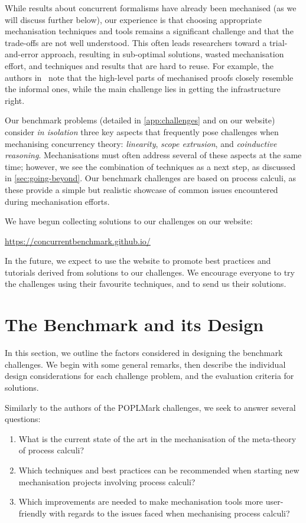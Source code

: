 \documentclass[runningheads]{llncs}
\begin{document}
While results about concurrent
formalisms have already been mechanised (as we will discuss further
below), our experience is that choosing appropriate mechanisation
techniques and tools remains a significant challenge and that the
trade-offs are not well understood.  This often leads researchers
toward a trial-and-error approach, resulting in sub-optimal solutions,
wasted mechanisation effort, and techniques and results that are hard
to reuse. For example, the authors in~\cite{Cruz-Filipe2021b} note that the high-level parts of
mechanised proofs closely resemble the informal ones, while the
main challenge lies in getting the infrastructure right.

Our benchmark problems (detailed in \cref{app:challenges} and on our website) consider
\emph{in isolation} three key aspects that frequently pose challenges
when mechanising concurrency theory: \emph{linearity}, \emph{scope
  extrusion}, and \emph{coinductive reasoning}.  Mechanisations must
often address several of these aspects at the same time; however, we
see the combination of techniques as a next
step, as discussed in \cref{sec:going-beyond}.
Our benchmark challenges are based on process calculi, as these provide a simple but
realistic showcase of common issues encountered during mechanisation
efforts.

We have begun collecting solutions to our challenges on our website:
%
\begin{center}
  \url{https://concurrentbenchmark.github.io/}
\end{center}
%
In the future, we expect to use the website to promote best practices and tutorials derived from solutions to our challenges.
We encourage everyone to try the challenges using their favourite techniques, and to send us their solutions.

\section{The Benchmark and its Design}\label{sec:design-discussion}
In this section, we outline the factors considered in designing the benchmark challenges.
We begin with some general remarks, then describe the individual design considerations for each challenge problem, and the evaluation criteria for solutions.

Similarly to the authors of the POPLMark challenges, we seek to answer several questions:
\begin{enumerate}[label=\textbf{(Q\arabic*)},leftmargin=10mm]
\item\label{item:rq1} What is the current state of the art in the mechanisation of  the meta-theory of process calculi?
\item\label{item:rq2} Which techniques and best practices can be recommended when starting new mechanisation projects involving process calculi?
\item\label{item:rq3} Which improvements are needed to make mechanisation tools more user-friendly with regards to the issues faced when mechanising process calculi?
\end{enumerate}
\end{document}
